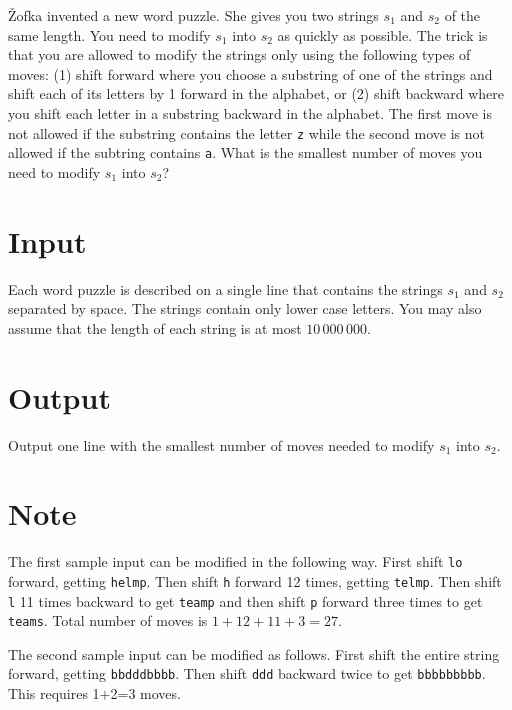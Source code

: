 
\v{Z}ofka invented a new word puzzle. She gives you two strings $s_1$ and $s_2$ of the same length. You need to modify $s_1$ into $s_2$ as quickly as possible. The trick is that you are allowed to modify the strings only using the following types of moves: (1) shift forward where you choose a substring of one of the strings and shift each of its letters by 1 forward in the alphabet, or (2) shift backward where you shift each letter in a substring backward in the alphabet. The first move is not allowed if the substring contains the letter {\tt z} while the second move is not allowed if the subtring contains {\tt a}. What is the smallest number of moves you need to modify $s_1$ into $s_2$?

\section*{Input}
Each word puzzle is described on a single line that contains the strings $s_1$ and $s_2$ separated
by space. The strings contain only lower case letters. You may also assume that the length of each
string is at most $10\,000\,000$.


\section*{Output}
Output one line with the smallest number of moves needed to modify $s_1$ into $s_2$.


\section*{Note}
The first sample input can be modified in the following way. First shift {\tt lo} forward, getting
{\tt helmp}. Then shift {\tt h} forward 12 times, getting {\tt telmp}. Then shift {\tt l} 11 times
backward to get {\tt teamp} and then shift {\tt p} forward three times to get {\tt teams}. Total
number of moves is $1+12+11+3=27$.

The second sample input can be modified as follows. First shift the entire string forward, getting {\tt bbdddbbbb}. Then shift {\tt ddd} backward twice to get {\tt bbbbbbbbb}. This requires 1+2=3 moves.
